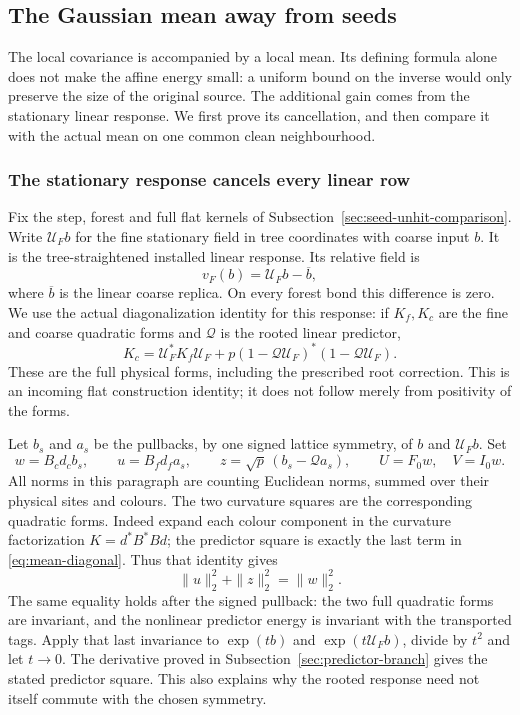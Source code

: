 \subsection{The Gaussian mean away from seeds}
\label{sec:local-mean}
The local covariance is accompanied by a local mean. Its defining
formula alone does not make the affine energy small: a uniform bound
on the inverse would only preserve the size of the original source.
The additional gain comes from the stationary linear response. We
first prove its cancellation, and then compare it with the actual
mean on one common clean neighbourhood.

\subsubsection{The stationary response cancels every linear row}
Fix the step, forest and full flat kernels of
Subsection~\ref{sec:seed-unhit-comparison}. Write $\mathcal U_F b$ for
the fine stationary field in tree coordinates with coarse input $b$.
It is the tree-straightened installed linear response. Its relative
field is
\[
 v_F(b)=\mathcal U_F b-\overline b,
\]
where $\overline b$ is the linear coarse replica. On every forest
bond this difference is zero. We use the actual diagonalization
identity for this response: if $K_f,K_c$ are the fine and coarse
quadratic forms and $\mathcal Q$ is the rooted linear predictor,
\begin{equation}\label{eq:mean-diagonal}
 K_c=\mathcal U_F^*K_f\mathcal U_F
       +p(1-\mathcal Q\mathcal U_F)^*
                     (1-\mathcal Q\mathcal U_F).
\end{equation}
These are the full physical forms, including the prescribed root
correction. This is an incoming flat construction identity; it does
not follow merely from positivity of the forms.

Let $b_s$ and $a_s$ be the pullbacks, by one signed lattice symmetry,
of $b$ and $\mathcal U_Fb$. Set
\[
 w=B_cd_cb_s,\qquad u=B_fd_fa_s,\qquad
 z=\sqrt p\,(b_s-\mathcal Qa_s),\qquad
 U=F_0w,\quad V=I_0w.
\]
All norms in this paragraph are counting Euclidean norms, summed
over their physical sites and colours. The two curvature squares
are the corresponding quadratic forms. Indeed expand each colour
component in the curvature factorization $K=d^*B^*Bd$; the predictor
square is exactly the last term in \eqref{eq:mean-diagonal}.
Thus that identity gives
\begin{equation}\label{eq:mean-norm-equality}
 \|u\|_2^2+\|z\|_2^2=\|w\|_2^2.
\end{equation}
The same equality holds after the signed pullback: the two full
quadratic forms are invariant, and the nonlinear predictor energy
is invariant with the transported tags. Apply that last invariance
to $\exp(tb)$ and $\exp(t\mathcal U_Fb)$, divide by $t^2$ and
let $t\to0$. The derivative proved in
Subsection~\ref{sec:predictor-branch} gives the stated predictor square.
This also explains why the rooted response need not itself commute
with the chosen symmetry.

